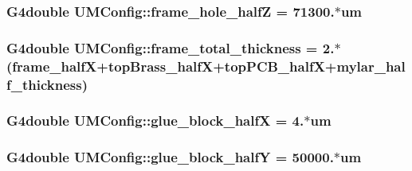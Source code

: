 \subsubsection[{frame\+\_\+hole\+\_\+half\+Z}]{\setlength{\rightskip}{0pt plus 5cm}G4double U\+M\+Config\+::frame\+\_\+hole\+\_\+half\+Z = 71300.$\ast$um}\label{structUMConfig_ac793ed9de1cb61e5a19e27ca6ca2bee8}
\hypertarget{structUMConfig_a940b4dce2ed84398b26316eeb1c1b35f}{}
\subsubsection[{frame\+\_\+total\+\_\+thickness}]{\setlength{\rightskip}{0pt plus 5cm}G4double U\+M\+Config\+::frame\+\_\+total\+\_\+thickness = 2.$\ast$({\bf frame\+\_\+half\+X}+{\bf top\+Brass\+\_\+half\+X}+{\bf top\+P\+C\+B\+\_\+half\+X}+{\bf mylar\+\_\+half\+\_\+thickness})}\label{structUMConfig_a940b4dce2ed84398b26316eeb1c1b35f}
\hypertarget{structUMConfig_ac5c60ff26c74f3d07cfabe0b028ffa1c}{}
\subsubsection[{glue\+\_\+block\+\_\+half\+X}]{\setlength{\rightskip}{0pt plus 5cm}G4double U\+M\+Config\+::glue\+\_\+block\+\_\+half\+X = 4.$\ast$um}\label{structUMConfig_ac5c60ff26c74f3d07cfabe0b028ffa1c}
\hypertarget{structUMConfig_a8156f7cb9cf8e37d84e14eb76822c74f}{}
\subsubsection[{glue\+\_\+block\+\_\+half\+Y}]{\setlength{\rightskip}{0pt plus 5cm}G4double U\+M\+Config\+::glue\+\_\+block\+\_\+half\+Y = 50000.$\ast$um}\label{structUMConfig_a8156f7cb9cf8e37d84e14eb76822c74f}
\hypertarget{structUMConfig_a136d2f46047e3459563a35438d86fe1f}{}
